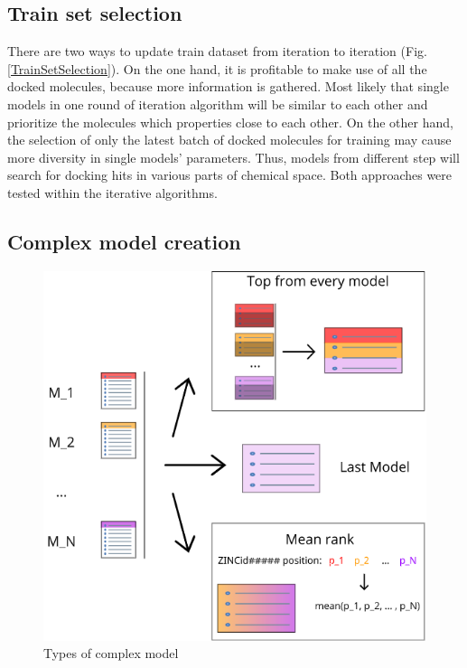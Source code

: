 \subsection{Train set selection}
There are two ways to update train dataset from iteration to iteration (Fig. \ref{TrainSetSelection}).
On the one hand, it is profitable to make use of all the docked molecules, because 
more information is gathered.
Most likely that single models in one round of iteration algorithm will be similar 
to each other and prioritize the molecules which properties close to each other.
On the other hand, the selection of only the latest batch of docked molecules for 
training may cause more diversity in single models' parameters.
Thus, models from different step will search for docking hits in various parts of 
chemical space.
Both approaches were tested within the iterative algorithms.\\

\subsection{Complex model creation}


\begin{figure}
    \centering
    \includegraphics[scale=0.8]{Images/image2.png}
    \caption{Types of complex model}
    \label{ComplexModels}
\end{figure}

